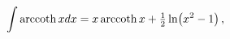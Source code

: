 \[\int\mathop{\mathrm{arccoth}\/}\nolimits xdx=x\mathop{\mathrm{arccoth}\/}%
\nolimits x+\tfrac{1}{2}\mathop{\ln\/}\nolimits\!\left(x^{2}-1\right),\]